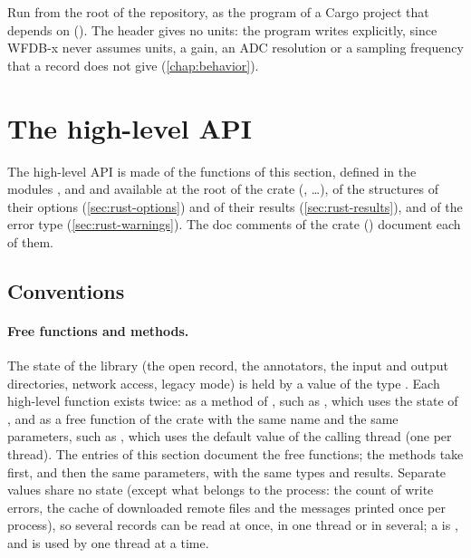 Run from the root of the repository, as the program  of a Cargo project
that depends on  (). The header 
gives no units: the program writes  explicitly, since WFDB-x never assumes
units, a gain, an ADC resolution or a sampling frequency that a record does not give
(\cref{chap:behavior}).

\section{The high-level API}
\label{sec:rust-api}

The high-level API is made of the functions of this section, defined in the modules
,  and  and available at the
root of the crate (, \ldots), of the structures of their options
(\cref{sec:rust-options}) and of their results (\cref{sec:rust-results}), and of the error
type  (\cref{sec:rust-warnings}). The doc comments of the
crate () document each of them.

\subsection{Conventions}
\label{sec:rust-conventions}

\paragraph{Free functions and methods.} The state of the library (the open record, the
annotators, the input and output directories, network access, legacy mode) is held by a
value of the type . Each high-level function exists twice: as a method of
, such as , which uses the state of
, and as a free function of the crate with the same name and the same
parameters, such as , which uses the default
 value of the calling thread (one per thread). The entries of this section
document the free functions; the methods take  first, and then the same
parameters, with the same types and results. Separate  values share no state
(except what belongs to the process: the count of write errors, the cache of downloaded
remote files and the messages printed once per process), so several records can be read
at once, in one thread or in several; a  is , and is used by one
thread at a time.


